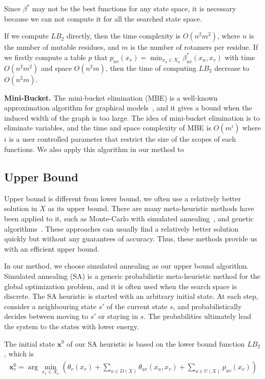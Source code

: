 Since $\beta^*$ may not be the best functions for any state space, it is necessary because we can not compute it for all the searched state space.

If we compute $LB_2$ directly, then the time complexity is $O(n^2m^2)$, where $n$ is the number of mutable residues, and $m$ is the number of rotamers per residue. If we firstly compute a table $p$ that $p_{uv}(x_v)=\min_{x_u\in X_u}\beta_{uv}^*(x_u,x_v)$ with time $O(n^2m^2)$ and space $O(n^2m)$, then the time of computing $LB_2$ decrease to $O(n^2m)$.

\noindent\textbf{Mini-Bucket.} The mini-bucket elimination (MBE) is a well-known approximation algorithm for graphical models~\cite[]{dechter2003mini, rollon2010evaluating, rollon2006mini}, and it gives a bound when the induced width of the graph is too large. The idea of mini-bucket elimination is to eliminate variables, and the time and space complexity of MBE is $O(m^i)$ where $i$ is a user controlled parameter that restrict the size of the scopes of each functions. We also apply this algorithm in our method to 

\subsection{Upper Bound}
Upper bound is different from lower bound, we often use a relatively better solution in $X$ as its upper bound. There are many meta-heuristic methods have been applied to it, such as Monte-Carlo with simulated annealing~\cite[]{kuhlman2000native, voigt2000trading}, and genetic algorithms~\cite[]{raha2000prediction}. These approaches can usually find a relatively better solution quickly but without any guarantees of accuracy. Thus, these methods provide us with an efficient upper bound.

In our method, we choose simulated annealing as our upper bound algorithm. Simulated annealing (SA) is a generic probabilistic meta-heuristic method for the global optimization problem, and it is often used when the search space is discrete. The SA heuristic is started with an arbitrary initial state. At each step, consider a neighbouring state $s'$ of the current state $s$, and probabilistically decides between moving to $s'$ or staying in $s$. The probabilities ultimately lead the system to the states with lower energy.

The initial state $\mathbf{x}^0$ of our SA heuristic is based on the lower bound function $LB_2$, which is
\begin{align*}
\mathbf{x}_v^0\!=\!\arg\!\min_{x_v\in X_v}\left(\theta_v(x_v)\!+\!\sum_{u\in D(X)}\theta_{uv}(x_u,x_v)\!+\!\sum_{u\in U(X)}p_{uv}(x_v)\right)
\end{align*}

